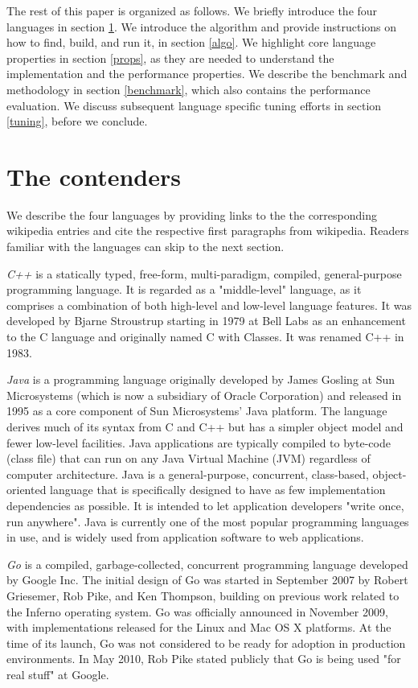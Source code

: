 The rest of this paper is organized as follows. We briefly introduce
the four languages in section \ref{contenders}.  We introduce the
algorithm and provide instructions on
how to find, build, and run it, in section \ref{algo}. 
We highlight core language properties in section
\ref{props}, as they are needed to understand the implementation and
the performance properties. We describe the benchmark and
methodology in section \ref{benchmark}, which also contains the
performance evaluation. We discuss subsequent language
specific tuning efforts in section \ref{tuning}, before we conclude.
 
 

\section{The contenders}
\label{contenders}

We describe the four languages by providing links to the  
the corresponding wikipedia entries and cite the respective first paragraphs
from wikipedia. 
Readers familiar with the languages can skip to the next section.

{\em C++} \cite{lang-cpp} is a statically typed,
free-form, multi-paradigm, compiled, general-purpose programming
language. It is regarded as a "middle-level" language, as it comprises
a combination of both high-level and low-level language features.
It was developed by Bjarne Stroustrup starting in 1979 at Bell Labs as
an enhancement to the C language and originally named C with
Classes. It was renamed C++ in 1983.


{\em Java} \cite{lang-java} is
a programming language originally developed by James Gosling at Sun
Microsystems (which is now a subsidiary of Oracle Corporation) and
released in 1995 as a core component of Sun Microsystems' Java
platform. The language derives much of its syntax from C and C++ but
has a simpler object model and fewer low-level facilities. Java
applications are typically compiled to byte-code (class file) that can
run on any Java Virtual Machine (JVM) regardless of computer
architecture. Java is a general-purpose, concurrent, class-based,
object-oriented language that is specifically designed to have as few
implementation dependencies as possible. It is intended to let
application developers "write once, run anywhere". Java is currently
one of the most popular programming languages in use, and is widely
used from application software to web applications.


{\em Go} \cite{lang-go} is a
compiled, garbage-collected, concurrent programming language developed
by Google Inc.  The initial design of Go was started in September 2007
by Robert Griesemer, Rob Pike, and Ken Thompson, building on previous
work related to the Inferno operating system. Go was officially
announced in November 2009, with implementations released for the
Linux and Mac OS X platforms. At the time of its launch, Go was not
considered to be ready for adoption in production environments. In May
2010, Rob Pike stated publicly that Go is being used "for real stuff"
at Google.

